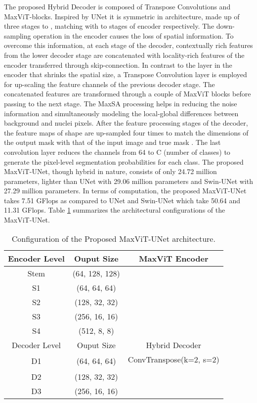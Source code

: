 \documentclass{article}
\begin{document}
The proposed Hybrid Decoder is composed of Transpose Convolutions and MaxViT-blocks. Inspired by UNet \cite{ronneberger2015u} it is symmetric in architecture, made up of three stages  to , matching with  to  stages of encoder respectively. The down-sampling operation in the encoder causes the loss of spatial information. To overcome this information, at each stage of the decoder, contextually rich features from the lower decoder stage are concatenated with locality-rich features of the encoder transferred through skip-connection. In contrast to the  layer in the encoder that shrinks the spatial size, a Transpose Convolution layer is employed for up-scaling the feature channels of the previous decoder stage. The concatenated features are transformed through a couple of MaxViT blocks before passing to the next stage. The MaxSA processing helps in reducing the noise information and simultaneously modeling the local-global differences between background and nuclei pixels. After the feature processing stages of the decoder, the feature maps of shape  are up-sampled four times to match the dimensions of the output mask with that of the input image and true mask . The last convolution layer reduces the channels from 64 to C (number of classes) to generate the pixel-level segmentation probabilities for each class. The proposed MaxViT-UNet, though hybrid in nature, consists of only 24.72 million parameters, lighter than UNet with 29.06 million parameters and Swin-UNet with 27.29 million parameters. In terms of computation, the proposed MaxViT-UNet takes 7.51 GFlops as compared to UNet and Swin-UNet which take 50.64 and 11.31 GFlops. Table \ref{table:maxvit-unet-architecture} summarizes the architectural configurations of the MaxViT-UNet.

\begin{table}[ht!]
  \centering
  \caption{Configuration of the Proposed MaxViT-UNet architecture.}\label{table:maxvit-unet-architecture}
  \begin{tabular*}{\textwidth}{@{\extracolsep\fill}ccc}
    \toprule Encoder Level & Ouput Size & MaxViT Encoder \\
    \midrule
      Stem & (64, 128, 128) &  \\
    \midrule
      S1 & (64, 64, 64) &  \\
    \midrule
      S2 & (128, 32, 32) &  \\
    \midrule
      S3 & (256, 16, 16) &  \\
    \midrule
      S4 & (512, 8, 8) &  \\
    \midrule
      Decoder Level & Ouput Size & Hybrid Decoder \\
    \midrule
      \multirow{2}{*}{D1} & \multirow{2}{*}{(64, 64, 64)} & ConvTranspose(k=2, s=2) \\
      & &  \\
    \midrule
      D2 & (128, 32, 32) &  \\
    \midrule
      D3 & (256, 16, 16) &  \\
    \hline
  \end{tabular*}
\end{table}
\end{document}
